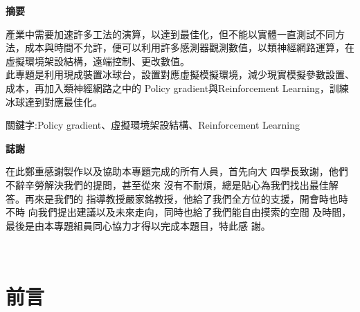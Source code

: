 \documentclass[14pt,a4paper]{report}  %
\begin{document}
\newpage
\renewcommand{\baselinestretch}{1.5} %
\clearpage  %
\sectionef
{} %
\begin{center}
\LARGE\textbf{摘要}\\
\begin{flushleft}
\fontsize{14pt}{2.5pt}\hspace{12pt} 產業中需要加速許多工法的演算，以達到最佳化，但不能以實體一直測試不同方法，成本與時間不允許，便可以利用許多感測器觀測數值，以類神經網路運算，在虛擬環境架設結構，遠端控制、更改數值。\\
\hspace{12pt} 此專題是利用現成裝置冰球台，設置對應虛擬模擬環境，減少現實模擬參數設置、成本，再加入類神經網路之中的 \sectionef Policy gradient與Reinforcement Learning，訓練冰球達到對應最佳化。
\end{flushleft}
\begin{center}
\fontsize{14pt}{2.5pt}關鍵字:\sectionef Policy gradient、虛擬環境架設結構、Reinforcement Learning
\end{center}
\newpage
\centerline\LARGE\textbf{誌謝}\\
\begin{flushleft}
\fontsize{14pt}{2.5pt}\hspace{12pt}在此鄭重感謝製作以及協助本專題完成的所有人員，首先向大
四學長致謝，他們不辭辛勞解決我們的提問，甚至從來
沒有不耐煩，總是貼心為我們找出最佳解答。再來是我們的
指導教授嚴家銘教授，他給了我們全方位的支援，開會時也時不時
向我們提出建議以及未來走向，同時也給了我們能自由摸索的空間
及時間，最後是由本專題組員同心協力才得以完成本題目，特此感
謝。
\end{flushleft}
\newpage
\renewcommand{\contentsname}{\centerline{\fontsize{18pt}{\baselineskip}\selectfont\textbf{目\quad 錄}}}
\tableofcontents　　%
\newpage
\renewcommand{\listfigurename}{\centerline{\fontsize{18pt}{\baselineskip}\selectfont\textbf{圖\quad 表\quad 目\quad 錄 }}}
\listoffigures
\newpage
\end{center}
\chapter{前言}
\renewcommand{\baselinestretch}{10.0} %
\setcounter{page}{1}  %
\fontsize{14pt}{2.5pt}\sectionef
\end{document}
